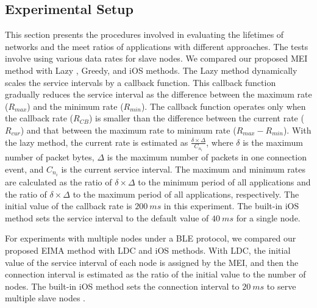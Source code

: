 \documentclass[10pt,journal,compsoc]{IEEEtran}
\begin{document}
\subsection{Experimental Setup}\label{sec:exp-setting}
This section presents the procedures involved in evaluating the lifetimes of networks and the meet ratios of applications with different approaches. The tests involve using various data rates for slave nodes. We compared our proposed MEI method with Lazy \cite{kindt2015adaptive}, Greedy, and iOS \cite{iOSdefault} methods.
The Lazy method dynamically scales the service intervals by a callback function. This callback function gradually reduces the service interval as the difference between the maximum rate ($R_{max}$) and the minimum rate ($R_{min}$). The callback function operates only when the callback rate ($R_{CB}$) is smaller than the difference between the current rate ($R_{cur}$) and that between the maximum rate to minimum rate ($R_{max}-R_{min}$). With the lazy method, the current rate is estimated as $\frac{\delta \times \Delta}{C_{n_i}}$, where $\delta$ is the maximum number of packet bytes, $\Delta$ is the maximum number of packets in one connection event, and $C_{n_i}$ is the current service interval. The maximum and minimum rates are calculated as the ratio of $\delta \times \Delta$ to the minimum period of all applications and the ratio of $\delta \times \Delta$ to the maximum period of all applications, respectively. The initial value of the callback rate is $200~ms$ in this experiment. The built-in iOS method sets the service interval to the default value of $40~ms$ for a single node.

For experiments with multiple nodes under a BLE protocol, we compared our proposed EIMA method with LDC \cite{doudou2013duo} and iOS \cite{iOSdefault} methods. With LDC, the initial value of the service interval of each node is assigned by the MEI, and then the connection interval is estimated as the ratio of the initial value to the number of nodes. The built-in iOS method sets the connection interval to $20~ms$ to serve multiple slave nodes \cite{giovanelli2015bluetooth}.

\end{document}
